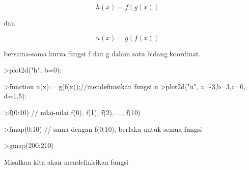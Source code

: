\documentclass[a4paper,10pt]{article}
\begin{document}
\begin{eulernotebook}
\begin{eulercomment}
\begin{eulercomment}
\begin{eulercomment}
\begin{eulercomment}
\begin{eulercomment}
\begin{eulercomment}
\begin{eulercomment}
\end{eulercomment}
\begin{eulerformula}
\[
h(x)=f(g(x))
\]
\end{eulerformula}
\begin{eulercomment}
dan

\end{eulercomment}
\begin{eulerformula}
\[
u(x)=g(f(x))
\]
\end{eulerformula}
\begin{eulercomment}
bersama-sama kurva fungsi f dan g dalam satu bidang koordinat.
\end{eulercomment}
\begin{eulerprompt}
>plot2d("h", b=0):
\end{eulerprompt}
\begin{eulerprompt}
>function u(x):= g(f(x));//mendefinisikan fungsi u
>plot2d("u", a=-3,b=3,c=0, d=1.5):
\end{eulerprompt}
\begin{eulerprompt}
>f(0:10) // nilai-nilai f(0), f(1), f(2), ..., f(10)
\end{eulerprompt}
\begin{euleroutput}
  [1,  4.31978,  10.4826,  19.1516,  32.4692,  50.3833,  72.7562,
  99.929,  130.69,  163.51,  200.58]
\end{euleroutput}
\begin{eulerprompt}
>fmap(0:10) // sama dengan f(0:10), berlaku untuk semua fungsi
\end{eulerprompt}
\begin{euleroutput}
  [1,  4.31978,  10.4826,  19.1516,  32.4692,  50.3833,  72.7562,
  99.929,  130.69,  163.51,  200.58]
\end{euleroutput}
\begin{eulerprompt}
>gmap(200:210)
\end{eulerprompt}
\begin{euleroutput}
  [0.987534,  0.987596,  0.987657,  0.987718,  0.987778,  0.987837,
  0.987896,  0.987954,  0.988012,  0.988069,  0.988126]
\end{euleroutput}
\begin{eulercomment}
Misalkan kita akan mendefinisikan fungsi


\end{eulercomment}
\end{eulercomment}
\end{eulercomment}
\end{eulercomment}
\end{eulercomment}
\end{eulercomment}
\end{eulercomment}
\end{eulernotebook}
\end{document}

